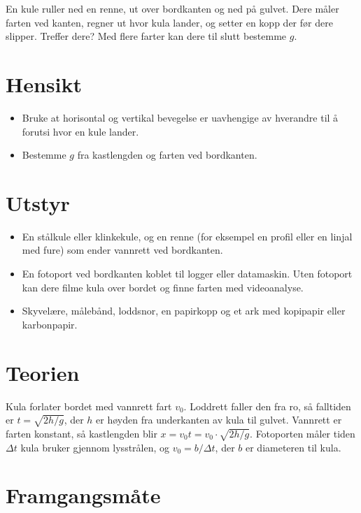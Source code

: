\documentclass[11pt]{article}
\begin{document}

En kule ruller ned en renne, ut over bordkanten og ned på gulvet. Dere måler farten ved kanten, regner ut hvor kula lander, og setter en kopp der før dere slipper. Treffer dere? Med flere farter kan dere til slutt bestemme $g$.

\section*{Hensikt}

\begin{itemize}
\item Bruke at horisontal og vertikal bevegelse er uavhengige av hverandre til å forutsi hvor en kule lander.
\item Bestemme $g$ fra kastlengden og farten ved bordkanten.
\end{itemize}

\section*{Utstyr}

\begin{itemize}
\item En stålkule eller klinkekule, og en renne (for eksempel en profil eller en linjal med fure) som ender vannrett ved bordkanten.
\item En fotoport ved bordkanten koblet til logger eller datamaskin. Uten fotoport kan dere filme kula over bordet og finne farten med videoanalyse.
\item Skyvelære, målebånd, loddsnor, en papirkopp og et ark med kopipapir eller karbonpapir.
\end{itemize}

\section*{Teorien}

Kula forlater bordet med vannrett fart $v_{0}$. Loddrett faller den fra ro, så falltiden er $t = \sqrt{2h/g}$, der $h$ er høyden fra underkanten av kula til gulvet. Vannrett er farten konstant, så kastlengden blir $x = v_{0}t = v_{0} \cdot \sqrt{2h/g}$. Fotoporten måler tiden $Δt$ kula bruker gjennom lysstrålen, og $v_{0} = b/Δt$, der $b$ er diameteren til kula.

\section*{Framgangsmåte}
\end{document}
